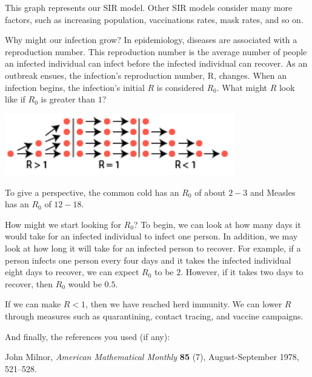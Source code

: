 \documentclass{amsart}
\theoremstyle{definition}
\numberwithin{equation}{section}
\begin{document}
\begin{sansmath}
This graph represents our SIR model. Other SIR models consider many more factors, such as increasing population, vaccinations rates, mask rates, and so on.

Why might our infection grow? In epidemiology, diseases are  associated with a reproduction number. This reproduction number is the average number of people an infected individual can infect before the infected individual can recover. As an outbreak ensues, the infection's reproduction number, R, changes. When an infection begins, the infection's initial $R$ is considered $R_0$. What might $R$ look like if $R_0$ is greater than $1$?

\begin{center}
  \includegraphics[width=10cm]{ReproductionNumber}
\end{center}

To give a perspective, the common cold has an $R_0$ of about $2-3$ and Measles has an $R_0$ of $12-18$.

How might we start looking for $R_0$? To begin, we can look at how many days it would take for an infected individual to infect one person. In addition, we may look at how long it will take for an infected person to recover. For example, if a person infects one person every four days and it takes the infected individual eight days to recover, we can expect $R_0$ to be $2$. However, if it takes two days to recover, then $R_0$ would be $0.5$.

If we can make $R < 1$, then we have reached herd immunity. We can lower $R$ through measures such as quarantining, contact tracing, and vaccine campaigns.

\newpage

And finally, the references you used (if any):


\begin{thebibliography}{12}

John Milnor, {\it
 American Mathematical Monthly}
    {\bf 85} (7), August-September 1978, 521--528.


\end{thebibliography}
\end{sansmath}
\end{document}

